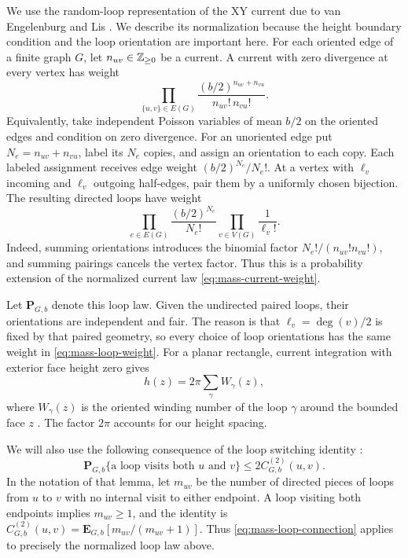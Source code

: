 We use the random-loop representation of the XY current due to
van Engelenburg and Lis \cite[Section~3]{vEL}.  We describe its
normalization because the height boundary condition and the loop
orientation are important here.
For each oriented edge of a finite graph \(G\), let
\(n_{uv}\in\mathbb Z_{\ge0}\) be a current.  A current with zero divergence at
every vertex has weight
\begin{equation}\label{eq:mass-current-weight}
            \prod_{\{u,v\}\in E(G)}
       \frac{(b/2)^{n_{uv}+n_{vu}}}{n_{uv}!\,n_{vu}!}.
\end{equation}
Equivalently, take independent Poisson variables of mean \(b/2\)
on the oriented edges and condition on zero divergence.
For an unoriented edge put \(N_e=n_{uv}+n_{vu}\), label its
\(N_e\) copies, and assign an orientation to each copy.
Each labeled assignment receives edge weight
\((b/2)^{N_e}/N_e!\).
At a vertex with \(\ell_v\) incoming and \(\ell_v\) outgoing
half-edges, pair them by a uniformly chosen bijection.
The resulting directed loops have weight
\begin{equation}\label{eq:mass-loop-weight}
 \prod_{e\in E(G)}\frac{(b/2)^{N_e}}{N_e!}
                     \prod_{v\in V(G)}\frac1{\ell_v!}.
\end{equation}
Indeed, summing orientations introduces the binomial factor
\(N_e!/(n_{uv}!n_{vu}!)\), and summing pairings cancels the vertex
factor.  Thus this is a probability extension of the normalized
current law \eqref{eq:mass-current-weight}.

Let \(\mathbf P_{G,b}\) denote this loop law.  Given the undirected
paired loops, their orientations are independent and fair.
The reason is that \(\ell_v=\deg(v)/2\) is fixed by that paired
geometry, so every choice of loop orientations has the same weight
in \eqref{eq:mass-loop-weight}.  For a planar rectangle, current
integration with exterior face height zero gives
\begin{equation}\label{eq:mass-winding-height}
                  h(z)=2\pi\sum_\gamma W_\gamma(z),
\end{equation}
where \(W_\gamma(z)\) is the oriented winding number of the loop
\(\gamma\) around the bounded face \(z\)
\cite[Proposition~7]{vEL}.  The factor \(2\pi\) accounts for our
height spacing.

We will also use the following consequence of the loop switching
identity \cite[Lemma~8]{vEL}:
\begin{equation}\label{eq:mass-loop-connection}
 \mathbf P_{G,b}\{\text{a loop visits both }u\text{ and }v\}
                         \le2C^{(2)}_{G,b}(u,v).
\end{equation}
In the notation of that lemma, let \(m_{uv}\) be the number of
directed pieces of loops from \(u\) to \(v\) with no internal visit
to either endpoint.  A loop visiting both endpoints implies
\(m_{uv}\ge1\), and the identity is
\(C^{(2)}_{G,b}(u,v)=\mathbf E_{G,b}[m_{uv}/(m_{uv}+1)]\).
Thus \eqref{eq:mass-loop-connection} applies to precisely the
normalized loop law above.

